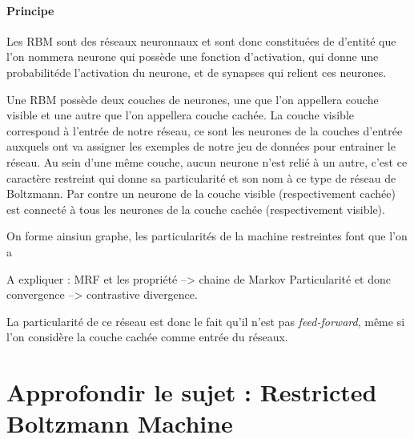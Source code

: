 \documentclass[a4paper,twoside]{report}
\begin{document}
\subsection{Principe}

Les RBM sont des réseaux neuronnaux et sont donc constituées de d'entité que
l'on nommera neurone qui possède une fonction d'activation, qui donne une
probabilitéde l'activation du neurone, et de synapses qui relient ces neurones.

Une RBM possède deux couches de neurones, une que l'on appellera couche
visible et une autre que l'on appellera couche cachée. La couche visible
correspond à l'entrée de notre réseau, ce sont les neurones de la couches
d'entrée auxquels ont va assigner les exemples de notre jeu de données pour
entrainer le réseau. Au sein d'une même couche, aucun neurone n'est relié à un
autre, c'est ce caractère restreint qui donne sa particularité et son nom à ce
type de réseau de Boltzmann. Par contre un neurone de la couche visible
(respectivement cachée) est connecté à tous les neurones de la couche cachée
(respectivement visible). 

On forme ainsiun graphe, les particularités de la machine restreintes font que
l'on a 

A expliquer : MRF et les propriété --> chaine de Markov
Particularité et donc convergence --> contrastive divergence.

La particularité de ce réseau est donc le fait qu'il n'est pas
\textit{feed-forward}, même si l'on considère la couche cachée comme entrée du
réseaux. 





\part[Restricted Boltzmann Machine]{Approfondir le sujet : Restricted Boltzmann Machine}
\end{document}
